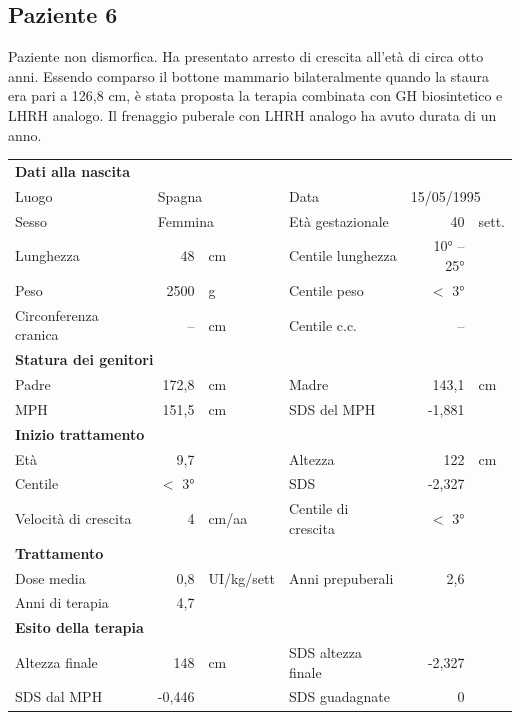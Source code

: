 \subsection*{Paziente 6}%

Paziente non dismorfica. Ha presentato arresto di crescita all'età di circa otto anni. Essendo comparso il bottone mammario bilateralmente quando la staura era pari a 126,8 cm, è stata proposta la terapia combinata con GH biosintetico e LHRH analogo. Il frenaggio puberale con LHRH analogo ha avuto durata di un anno.   

\begin{table}[h]
\begin{tabular}{lrllrl}
\toprule
\multicolumn{6}{l}{\textbf{Dati alla nascita}}\\
Luogo 		& \multicolumn{2}{l}{Spagna} 	& Data 					& \multicolumn{2}{l}{15/05/1995} 	\\
Sesso 		& \multicolumn{2}{l}{Femmina} 	& Età gestazionale 		& 40 		& sett.\\
Lunghezza 	& 48 		& cm 				& Centile lunghezza		& 10° -- 25° 		\\
Peso 		& 2500 		& g					& Centile peso			& $<$ 3° 		\\
Circonferenza cranica	& -- 		& cm 	& Centile c.c.			& -- \\
\midrule
\multicolumn{6}{l}{\textbf{Statura dei genitori}}\\
Padre 		& 172,8 & cm 	& Madre 				& 143,1 & cm \\
MPH 		& 151,5 & cm 	& SDS del MPH 			& -1,881\\
\midrule
\multicolumn{6}{l}{\textbf{Inizio trattamento}} \\
Età	& 9,7 & 		& Altezza 				& 122 & cm  \\
Centile & $<$ 3° 	 &		& SDS		& -2,327 \\
Velocità di crescita & 4 & cm/aa	& Centile di crescita & $<$ 3°\\
\midrule
\multicolumn{6}{l}{\textbf{Trattamento}} \\
Dose media		& 0,8 & UI/kg/sett & Anni prepuberali & 2,6\\
Anni di terapia & 4,7\\
\midrule
\multicolumn{6}{l}{\textbf{Esito della terapia}} \\
Altezza finale			& 148 & cm 	& SDS altezza finale		& -2,327\\
SDS dal MPH				& -0,446 &		& SDS guadagnate 			& 0\\
\bottomrule
\end{tabular}
\end{table}
\clearpage

